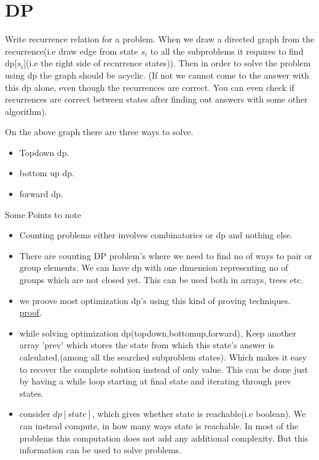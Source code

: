 \documentclass[../Notes.tex]{subfiles}
\begin{document}
\chapter{DP}

Write recurrence relation for a problem. When we draw a directed graph from the recurrence(i.e draw edge from state $s_i$ to all the subproblems it requires to find dp[$s_i$](i.e the right side of recurrence states)). Then in order to solve the problem using dp the graph should be acyclic. (If not we cannot come to the answer with this dp alone, even though the recurrences are correct. You can even check if recurrences are correct between states after finding out answers with some other algorithm).

On the above graph there are three ways to solve.
\begin{itemize}
	\item Topdown dp.
	\item bottom up dp.
	\item forward dp.
\end{itemize}	
Some Points to note
\begin{itemize}
	\item Counting problems either involves combinatorics or dp and nothing else.
	\item There are counting DP problem's where we need to find no of ways to pair or group elements. We can have dp with one dimension representing no of groups which are not closed yet. This can be used both in arrays, trees etc.  
	\item we proove most optimization dp's using this kind of proving techniques.
	\href{Material/dpproof.pdf}{proof}.\pagebreak
	\item while solving optimization dp(topdown,bottomup,forward), Keep another array 'prev' which stores the state from which this state's answer is calculated.(among all the searched subproblem states). Which makes it easy to recover the complete solution instead of only value. This can be done just by having a while loop starting at final state and iterating through prev states.
	\item consider $dp[state]$, which gives whether state is reachable(i.e boolean). We can instead compute, in how many ways state is reachable. In most of the problems this computation does not add any additional complexity. But this information can be used to solve problems.   
\end{itemize}
\end{document}
